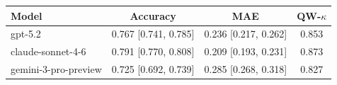 \begin{table}[t]
\centering
\begin{tabular}{lccc}
\toprule
\textbf{Model} & \textbf{Accuracy} & \textbf{MAE} & \textbf{QW-$\kappa$} \\
\midrule
gpt-5.2 & 0.767 [0.741, 0.785] & 0.236 [0.217, 0.262] & 0.853 \\
claude-sonnet-4-6 & 0.791 [0.770, 0.808] & 0.209 [0.193, 0.231] & 0.873 \\
gemini-3-pro-preview & 0.725 [0.692, 0.739] & 0.285 [0.268, 0.318] & 0.827 \\
\bottomrule
\end{tabular}
\end{table}